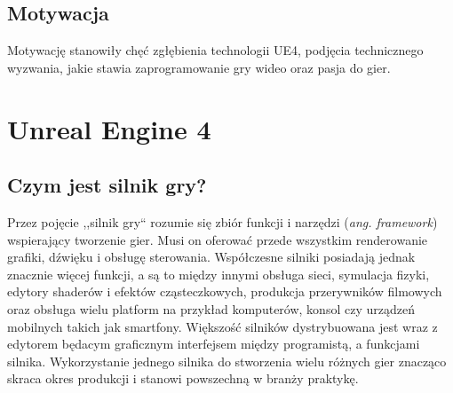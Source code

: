 \documentclass[multip]{SGGW-thesis}
\begin{document}
\section{Motywacja}
Motywację stanowiły chęć zgłębienia technologii UE4, podjęcia technicznego wyzwania, jakie stawia zaprogramowanie gry wideo oraz pasja do gier.
\chapter{Unreal Engine 4}
\section{Czym jest silnik gry?}
Przez pojęcie ,,silnik gry`` rozumie się zbiór funkcji i narzędzi ({\em ang. framework}) wspierający tworzenie gier. Musi on oferować przede wszystkim renderowanie grafiki, dźwięku i obsługę sterowania. Współczesne silniki posiadają jednak znacznie więcej funkcji, a są to między innymi obsługa sieci, symulacja fizyki, edytory shaderów i efektów cząsteczkowych, produkcja przerywników filmowych oraz obsługa wielu platform na przykład komputerów, konsol czy urządzeń mobilnych takich jak smartfony. Większość silników dystrybuowana jest wraz z edytorem będacym graficznym interfejsem między programistą, a funkcjami silnika. Wykorzystanie jednego silnika do stworzenia wielu różnych gier znacząco skraca okres produkcji i stanowi powszechną w branży praktykę\cite{learning-unreal}\cite{wiki-game-engine}.
\end{document}
